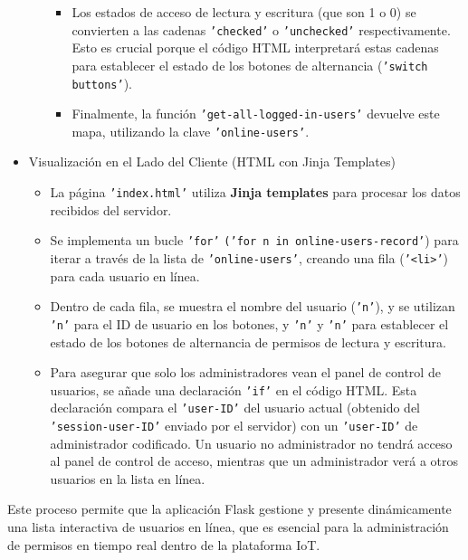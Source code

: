 \documentclass{report}
\begin{document}
\begin{itemize}
\begin{itemize}
\begin{itemize}
\begin{itemize}
                        \end{itemize}
                    \item Los estados de acceso de lectura y escritura (que son 1 o 0) se convierten a las cadenas \texttt{'checked'} o \texttt{'unchecked'} 
                    respectivamente. Esto es crucial porque el código HTML interpretará estas cadenas para establecer el estado de los botones de alternancia 
                    (\texttt{'switch buttons'}).
                    \item Finalmente, la función \texttt{'get-all-logged-in-users'} devuelve este mapa, utilizando la clave \texttt{'online-users'}.
                \end{itemize} 
        \end{itemize}

    \item Visualización en el Lado del Cliente (HTML con Jinja Templates)
        \begin{itemize}
            \item La página \texttt{'index.html'} utiliza \textbf{Jinja templates} para procesar los datos recibidos del servidor.
            \item Se implementa un bucle \texttt{'for'} \texttt{('for n in online-users-record'}) para iterar a través de la lista de \texttt{'online-users'}, 
            creando una fila (\texttt{'<li>'}) para cada usuario en línea.
            \item Dentro de cada fila, se muestra el nombre del usuario (\texttt{'n'}), y se utilizan \texttt{'n'} para el ID de usuario en los botones, y 
            \texttt{'n'} y \texttt{'n'} para establecer el estado de los botones de alternancia de permisos de lectura y escritura.
            \item Para asegurar que solo los administradores vean el panel de control de usuarios, se añade una declaración \texttt{'if'} en el código 
            HTML. Esta declaración compara el \texttt{'user-ID'} del usuario actual (obtenido del \texttt{'session-user-ID'} enviado por el servidor) con un 
            \texttt{'user-ID'} de administrador codificado. Un usuario no administrador no tendrá acceso al panel de control de acceso, mientras que un 
            administrador verá a otros usuarios en la lista en línea.
        \end{itemize}
\end{itemize}

Este proceso permite que la aplicación Flask gestione y presente dinámicamente una lista interactiva de usuarios en línea, que es esencial para la 
administración de permisos en tiempo real dentro de la plataforma IoT.
\end{document}
